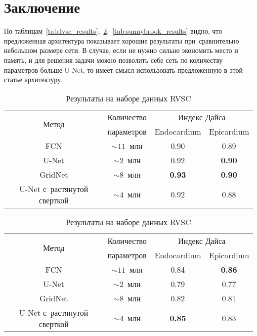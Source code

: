 \section{Заключение}

По таблицам~\ref{tab:lvsc_results},~\ref{tab:rvsc_results},~\ref{tab:sunnybrook_results} видно, что предложенная архитектура показывает хорошие результаты при~сравнительно небольшом размере сети. В случае, если не нужно сильно экономить место и память, и для решения задачи можно позволить себе сеть по количеству параметров больше U-Net, то имеет смысл использовать предложенную в этой статье архитектуру. 

\begin{table}[h]
  \begin{center}
    \caption{Результаты на наборе данных LVSC} \label{tab:lvsc_results}
    \begin{tabular}{ |c||*{3}{c|} }
      \hline
      \multirow{2}{*}{Метод}      & Количество   & \multicolumn{2}{c|}{Индекс Дайса} \\ \cline{3-4}
                                  & параметров   & Endocardium   & Epicardium        \\ \hline
      \hline
      FCN                         & $\sim11$~млн & 0.90          & 0.89              \\ \hline
      U-Net                       &  $\sim2$~млн & 0.92          & \textbf{0.90}     \\ \hline
      GridNet                     &  $\sim8$~млн & \textbf{0.93} & \textbf{0.90}     \\ \hline
      U-Net с~растянутой сверткой &  $\sim4$~млн & 0.92          & 0.88              \\ 
      \hline
    \end{tabular}

    \vspace{0.6cm}
    
    \caption{Результаты на наборе данных RVSC} \label{tab:rvsc_results}
    \begin{tabular}{ |c||*{3}{c|} }
      \hline
      \multirow{2}{*}{Метод}      & Количество   & \multicolumn{2}{c|}{Индекс Дайса} \\ \cline{3-4}
                                  & параметров   & Endocardium   & Epicardium        \\ \hline
      \hline
      FCN                         & $\sim11$~млн & 0.84          & \textbf{0.86}     \\ \hline
      U-Net                       &  $\sim2$~млн & 0.79          & 0.77              \\ \hline
      GridNet                     &  $\sim8$~млн & 0.82          & 0.81              \\ \hline
      U-Net с~растянутой сверткой &  $\sim4$~млн & \textbf{0.85} & 0.83              \\ 
      \hline
    \end{tabular}


\end{center}
\end{table}
